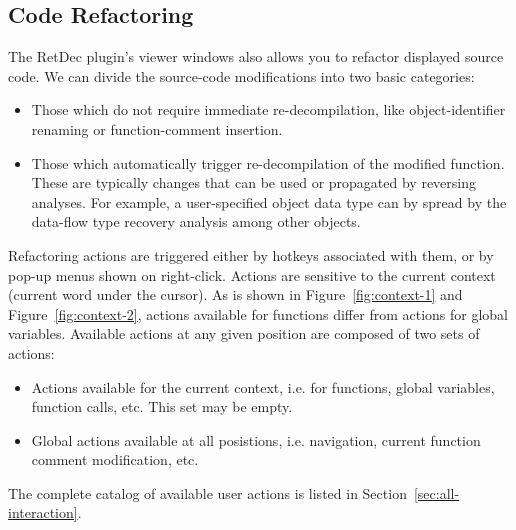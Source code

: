 \documentclass[pdftex, a4paper,12pt, oneside, svgnames]{article}
\begin{document}
\subsection{Code Refactoring}
\label{sec:refactoring}
The RetDec plugin's viewer windows also allows you to refactor displayed source code. We can divide the source-code modifications into two basic categories:
\begin{itemize}
	\item Those which do not require immediate re-decompilation, like object-identifier renaming or function-comment insertion.
	\item Those which automatically trigger re-decompilation of the modified function. These are typically changes that can be used or propagated by reversing analyses. For example, a user-specified object data type can by spread by the data-flow type recovery analysis among other objects.
\end{itemize}

Refactoring actions are triggered either by hotkeys associated with them, or by pop-up menus shown on right-click. Actions are sensitive to the current context (current word under the cursor). As is shown in Figure~\ref{fig:context-1} and Figure~\ref{fig:context-2}, actions available for functions differ from actions for global variables. Available actions at any given position are composed of two sets of actions:
\begin{itemize}
	\item Actions available for the current context, i.e. for functions, global variables, function calls, etc. This set may be empty.
	\item Global actions available at all posistions, i.e. navigation, current function comment modification, etc.
\end{itemize}
The complete catalog of available user actions is listed in Section~\ref{sec:all-interaction}.
\end{document}
